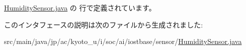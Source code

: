  \hyperlink{_humidity_sensor_8java_source}{Humidity\-Sensor.\-java} の  行で定義されています。



このインタフェースの説明は次のファイルから生成されました\-:\begin{DoxyCompactItemize}
\item 
src/main/java/jp/ac/kyoto\-\_\-u/i/soc/ai/iostbase/sensor/\hyperlink{_humidity_sensor_8java}{Humidity\-Sensor.\-java}\end{DoxyCompactItemize}
